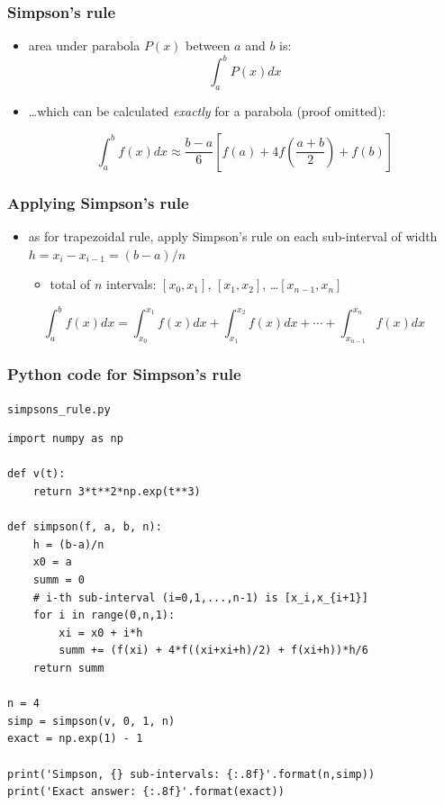 \documentclass[english,14pt]{beamer}
\newcommand\blue[1]{{\color{blue} #1}}
\begin{document}
\begin{frame}[fragile]

\frametitle{Simpson's rule}

\begin{itemize}
	\item area under parabola $P(x)$ between $a$ and $b$ is:
\[
\int_a^b P(x) dx
\]
\item[] \ldots which can be calculated \emph{exactly} for a parabola (proof omitted):

\blue{
\[
\int_a^b f(x)dx \approx \frac{b-a}{6} \left[ f(a) + 4f\left(\frac{a+b}{2}\right) + f(b)\right]
\]
}

\end{itemize}

\end{frame}


\begin{frame}[fragile]

\frametitle{Applying Simpson's rule}

\begin{itemize}
\item as for trapezoidal rule, apply Simpson's rule on each sub-interval of width $h = x_i - x_{i-1} = (b-a)/n$
	\begin{itemize}
		\item total of $n$ intervals: $[x_0,x_1]$, $[x_1,x_2]$, \ldots $[x_{n-1},x_n]$
	\end{itemize}
\end{itemize}

{\small
\[
\int_a^b f(x)dx = \int_{x_0}^{x_1} f(x)dx + \int_{x_1}^{x_2} f(x)dx + \cdots + \int_{x_{n-1}}^{x_n} f(x)dx
\]
}

\end{frame}


\begin{frame}[fragile]

\frametitle{Python code for Simpson's rule}
\vspace*{-2mm}
\texttt{simpsons\_rule.py}
\begin{lstlisting}[style=CStyle,basicstyle=\scriptsize]
import numpy as np

def v(t):
    return 3*t**2*np.exp(t**3)

def simpson(f, a, b, n):
    h = (b-a)/n
    x0 = a
    summ = 0
    # i-th sub-interval (i=0,1,...,n-1) is [x_i,x_{i+1}]
    for i in range(0,n,1):
        xi = x0 + i*h
        summ += (f(xi) + 4*f((xi+xi+h)/2) + f(xi+h))*h/6
    return summ

n = 4
simp = simpson(v, 0, 1, n)
exact = np.exp(1) - 1

print('Simpson, {} sub-intervals: {:.8f}'.format(n,simp))
print('Exact answer: {:.8f}'.format(exact))
\end{lstlisting}

\end{frame}
\end{document}
